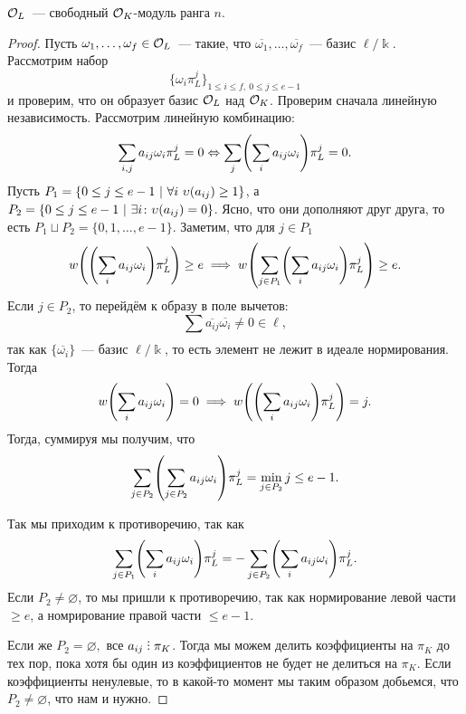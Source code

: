 	 \begin{statement} 
	 	$\mathcal{O}_{L}$~--- свободный $\mathcal{O}_{K}$-модуль ранга $n$.
	 \end{statement}
	 \begin{proof}
	 Пусть $\omega_1, \ldots, \omega_{f} \in \mathcal{O}_{L}$~--- такие, что $\overline{\omega_1}, \ldots, \overline{\omega_{f}}$~--- базис $\ell/\Bbbk$. Рассмотрим набор 
	 \[
	 	\{ \omega_i \pi_{L}^{j} \}_{1 \le i \le f,\  0 \le j \le e - 1}
	 \]
	 и проверим, что он образует базис $\mathcal{O}_{L}$ над $\mathcal{O}_{K}$. Проверим сначала линейную независимость. Рассмотрим линейную комбинацию: 
	 \[
	 	\sum_{i, j} a_{i j} \omega_{i} \pi_{L}^{j} = 0 \Leftrightarrow  \sum_{j} \lr*{\sum_{i} a_{i j} \omega_{i} } \pi_{L}^{j} = 0. 
	 \]
	 Пусть $P_{1} = \{ 0 \le j \le e - 1 \ \vert \ \forall i \  \upsilon(a_{i j}) \ge 1 \}$, а $P_{2} = \{ 0 \le j \le e - 1 \ \vert \ \exists i \colon \upsilon(a_{i j}) = 0\}$. Ясно, что они дополняют друг друга, то есть $P_1 \sqcup P_2 = \{ 0, 1, \ldots, e - 1 \}$.  Заметим, что для $j \in P_1$
	 \[
	 	w\lr*{\lr*{\sum_{i} a_{i j} \omega_{i} } \pi_{L}^{j}} \ge e \implies w\lr*{\sum_{j \in P_1} \lr*{\sum_{i} a_{i j} \omega_{i} } \pi_{L}^{j}} \ge e. 
	 \]
	 Если $j \in P_2$, то перейдём к образу в поле вычетов: 
	 \[
	 	\sum_{} \overline{a_{i j}} \overline{\omega_i} \neq 0 \in \ell,
	 \]
	 так как $\{ \overline{\omega_i}\}$~--- базис $\ell/\Bbbk$, то есть элемент не лежит в идеале нормирования. Тогда 
	 \[
	 	w\lr*{\sum_{i} a_{i j} \omega_{i}} = 0 \implies w\lr*{\lr*{\sum_{i} a_{i j} \omega_{i}} \pi_{L}^{j}} = j.
	 \]
	 Тогда, суммируя мы получим, что 
	 \[
	 	\sum_{j \in P_2} \lr*{\sum_{j \in P_2} a_{i j} \omega_{i}} \pi_{L}^{j} = \min_{j \in P_2}{j} \le e - 1. 
	 \]

	 Так мы приходим к противоречию, так как 
	 \[
	 	\sum_{j \in P_1} \lr*{\sum_{i} a_{i j} \omega_{i} } \pi_{L}^{j}  = - \sum_{j \in P_2} \lr*{\sum_{i} a_{i j} \omega_{i} } \pi_{L}^{j}.
	 \]
	 Если $P_2 \neq \varnothing$, то мы пришли к противоречию, так как нормирование левой части $\ge e$, а номрирование правой части $\le e - 1$.

	 Если же $P_2 = \varnothing,$ все $a_{i j} \divby \pi_{K}$. Тогда мы можем делить коэффициенты на $\pi_{K}$ до тех пор, пока хотя бы один из коэффициентов не будет не делиться на $\pi_K$. Если коэффициенты ненулевые, то в какой-то момент мы таким образом добьемся, что $P_2 \neq \varnothing$, что нам и нужно. 


\end{proof}
